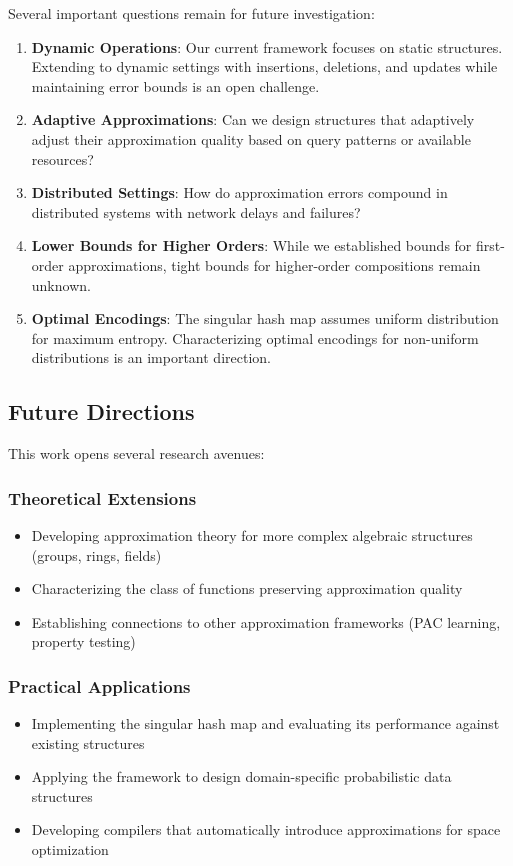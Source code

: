 Several important questions remain for future investigation:

\begin{enumerate}
    \item \textbf{Dynamic Operations}: Our current framework focuses on static structures.
    Extending to dynamic settings with insertions, deletions, and updates while maintaining error bounds is an open challenge.

    \item \textbf{Adaptive Approximations}: Can we design structures that adaptively adjust their approximation quality based on query patterns or available resources?

    \item \textbf{Distributed Settings}: How do approximation errors compound in distributed systems with network delays and failures?

    \item \textbf{Lower Bounds for Higher Orders}: While we established bounds for first-order approximations, tight bounds for higher-order compositions remain unknown.

    \item \textbf{Optimal Encodings}: The singular hash map assumes uniform distribution for maximum entropy.
    Characterizing optimal encodings for non-uniform distributions is an important direction.
\end{enumerate}

\subsection{Future Directions}

This work opens several research avenues:

\subsubsection{Theoretical Extensions}
\begin{itemize}
    \item Developing approximation theory for more complex algebraic structures (groups, rings, fields)
    \item Characterizing the class of functions preserving approximation quality
    \item Establishing connections to other approximation frameworks (PAC learning, property testing)
\end{itemize}

\subsubsection{Practical Applications}
\begin{itemize}
    \item Implementing the singular hash map and evaluating its performance against existing structures
    \item Applying the framework to design domain-specific probabilistic data structures
    \item Developing compilers that automatically introduce approximations for space optimization
\end{itemize}

